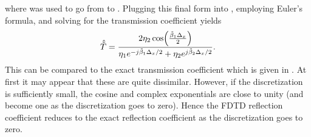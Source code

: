 where  was used to go from
 to .  Plugging
this final form into , employing Euler's
formula, and solving for the transmission coefficient yields
\begin{equation}
  \hat{\tilde{T}} = \frac{2 \eta_2 \cos\!\left(\frac{\tilde{\beta}_1\Delta_x}{2}\right)}
             {\eta_1 e^{-j\tilde{\beta}_1\Delta_x/2} + \eta_2 e^{j\tilde{\beta}_2\Delta_x/2}}.
  \label{eq:fdtdTransCoefMess}
\end{equation}
This can be compared to the exact transmission coefficient which is
given in .  At first it may appear that
these are quite dissimilar.  However, if the discretization is
sufficiently small, the cosine and complex exponentials are close to
unity (and become one as the discretization goes to zero).  Hence the
FDTD reflection coefficient reduces to the exact reflection
coefficient as the discretization goes to zero.

